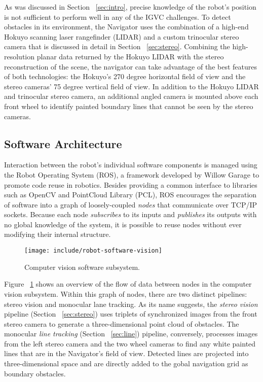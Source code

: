 \documentclass[twocolumn,11pt]{article}
\begin{document}
As was discussed in Section ~\ref{sec:intro}, precise knowledge of the robot's
position is not sufficient to perform well in any of the IGVC challenges. To
detect obstacles in its environment, the Navigator uses the combination of a
high-end Hokuyo scanning laser rangefinder (LIDAR) and a custom trinocular
stereo camera that is discussed in detail in Section ~\ref{sec:stereo}.
Combining the high-resolution planar data returned by the Hokuyo LIDAR with the
stereo reconstruction of the scene, the navigator can take advantage of the
best features of both technologies: the Hokuyo's 270 degree horizontal field of
view and the stereo cameras' 75 degree vertical field of view. In addition to
the Hokuyo LIDAR and trinocular stereo camera, an additional angled camera is
mounted above each front wheel to identify painted boundary lines that cannot
be seen by the stereo cameras.

\subsection{Software Architecture}
\label{sec:robot-software}
Interaction between the robot's individual software components is managed
using the Robot Operating System (ROS), a framework developed by Willow Garage
to promote code reuse in robotics. Besides providing a common interface to
libraries such as OpenCV and PointCloud Library (PCL), ROS encourages the
separation of software into a graph of loosely-coupled \textit{nodes} that
communicate over TCP/IP sockets. Because each node \textit{subscribes} to its
inputs and \textit{publishes} its outputs with no global knowledge of the
system, it is possible to reuse nodes without ever modifying their internal
structure.

\begin{figure}
	\centering
	\texttt{[image: include/robot-software-vision]}
	\caption{Computer vision software subsystem.}
	\label{fig:robot-vision}
\end{figure}

Figure ~\ref{fig:robot-vision} shows an overview of the flow of data between
nodes in the computer vision subsystem. Within this graph of nodes, there are
two distinct pipelines: stereo vision and monocular lane tracking. As its name
suggests, the \textit{stereo vision} pipeline (Section ~\ref{sec:stereo}) uses
triplets of synchronized images from the front stereo camera to generate a
three-dimensional point cloud of obstacles. The monocular \textit{line
tracking} (Section ~\ref{sec:line}) pipeline, conversely, processes images from
the left stereo camera and the two wheel cameras to find any white painted
lines that are in the Navigator's field of view. Detected lines are projected
into three-dimensional space and are directly added to the gobal navigation
grid as boundary obstacles.
\end{document}
